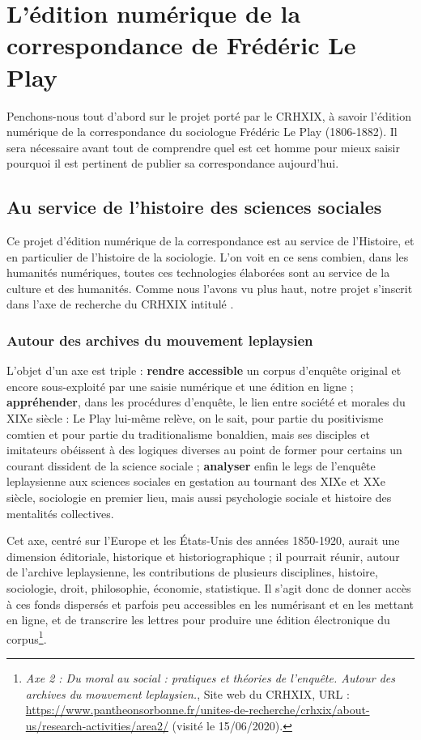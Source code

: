 \section{L'édition numérique de la correspondance de Frédéric Le Play}

Penchons-nous tout d'abord sur le projet porté par le CRHXIX, à savoir l'édition numérique de la correspondance du sociologue Frédéric Le Play (1806-1882).
Il sera nécessaire avant tout de comprendre quel est cet homme pour mieux saisir pourquoi il est pertinent de publier sa correspondance aujourd'hui.


\subsection{Au service de l'histoire des sciences sociales}
Ce projet d'édition numérique de la correspondance est au service de l'Histoire, et en particulier de l'histoire de la sociologie. L'on voit en ce sens combien, dans les humanités numériques, toutes ces technologies élaborées sont au service de la culture et des humanités. Comme nous l'avons vu plus haut, notre projet s'inscrit dans l'axe de recherche du CRHXIX intitulé  .

\subsubsection{Autour des archives du mouvement leplaysien} 

L’objet d’un axe  est triple : \textbf{rendre accessible} un corpus d’enquête original et encore sous-exploité par une saisie numérique et une édition en ligne ; \textbf{appréhender}, dans les procédures d’enquête, le lien entre société et morales du XIXe siècle : Le Play lui-même relève, on le sait, pour partie du positivisme comtien et pour partie du traditionalisme bonaldien, mais ses disciples et imitateurs obéissent à des logiques diverses au point de former pour certains un courant dissident de la science sociale ; \textbf{analyser} enfin le legs de l’enquête leplaysienne aux sciences sociales en gestation au tournant des XIXe et XXe siècle, sociologie en premier lieu, mais aussi psychologie sociale et histoire des mentalités collectives.

Cet axe, centré sur l’Europe et les États-Unis des années 1850-1920, aurait une dimension éditoriale, historique et historiographique ; il pourrait réunir, autour de l’archive leplaysienne, les contributions de plusieurs disciplines, histoire, sociologie, droit, philosophie, économie, statistique.
Il s’agit donc de donner accès à ces fonds dispersés et parfois peu accessibles en les numérisant et en les mettant en ligne, et de transcrire les lettres pour produire une édition électronique du corpus\footnote{\emph{Axe 2 : Du moral au social : pratiques et théories de l'enquête. Autour des archives du mouvement leplaysien.}, Site web du CRHXIX, URL : \url{https://www.pantheonsorbonne.fr/unites-de-recherche/crhxix/about-us/research-activities/area2/} (visité le 15/06/2020).}.

